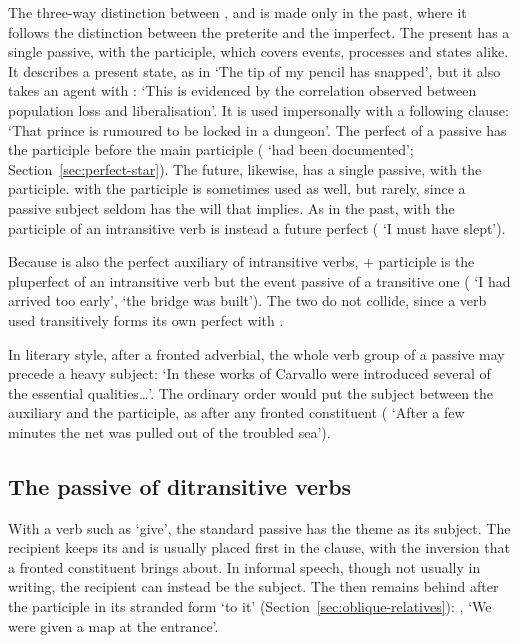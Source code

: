 The three-way distinction between ,  and  is made only in the past, where it follows the distinction between the preterite and the imperfect. The present has a single passive,  with the participle, which covers events, processes and states alike. It describes a present state, as in  `The tip of my pencil has snapped', but it also takes an agent with :  `This is evidenced by the correlation observed between population loss and liberalisation'. It is used impersonally with a following clause:  `That prince is rumoured to be locked in a dungeon'. The perfect of a passive has the participle  before the main participle ( `had been documented'; Section~\ref{sec:perfect-star}).
The future, likewise, has a single passive,  with the participle.  with the participle is sometimes used as well, but rarely, since a passive subject seldom has the will that  implies. As in the past,  with the participle of an intransitive verb is instead a future perfect ( `I must have slept').

Because  is also the perfect auxiliary of intransitive verbs,  + participle is the pluperfect of an intransitive verb but the event passive of a transitive one ( `I had arrived too early',  `the bridge was built'). The two do not collide, since a verb used transitively forms its own perfect with .

In literary style, after a fronted adverbial, the whole verb group of a passive may precede a heavy subject:  `In these works of Carvallo were introduced several of the essential qualities\ldots'. The ordinary order would put the subject between the auxiliary and the participle, as after any fronted constituent ( `After a few minutes the net was pulled out of the troubled sea').

\subsection{The passive of ditransitive verbs}
With a verb such as  `give', the standard passive has the theme as its subject. The recipient keeps its  and is usually placed first in the clause, with the inversion that a fronted constituent brings about.
In informal speech, though not usually in writing, the recipient can instead be the subject. The  then remains behind after the participle in its stranded form  `to it' (Section~\ref{sec:oblique-relatives}): ,  `We were given a map at the entrance'.

